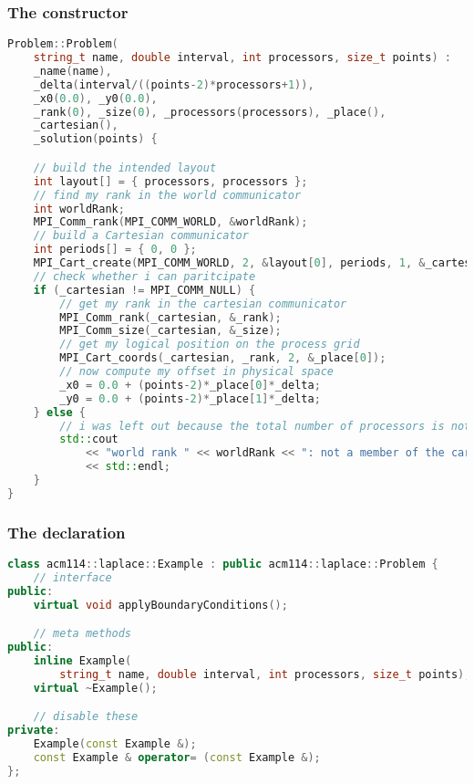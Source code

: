 \begin{frame}[fragile]
%
  \frametitle{The  constructor}
%
  \begin{lstlisting}[language=c++,name=mpi:driver,basicstyle=\tt\bfseries\tiny]
Problem::Problem(
    string_t name, double interval, int processors, size_t points) :
    _name(name),
    _delta(interval/((points-2)*processors+1)),
    _x0(0.0), _y0(0.0),
    _rank(0), _size(0), _processors(processors), _place(),
    _cartesian(),
    _solution(points) {

    // build the intended layout
    int layout[] = { processors, processors };
    // find my rank in the world communicator
    int worldRank;
    MPI_Comm_rank(MPI_COMM_WORLD, &worldRank);
    // build a Cartesian communicator
    int periods[] = { 0, 0 };
    MPI_Cart_create(MPI_COMM_WORLD, 2, &layout[0], periods, 1, &_cartesian);
    // check whether i can paritcipate
    if (_cartesian != MPI_COMM_NULL) {
        // get my rank in the cartesian communicator
        MPI_Comm_rank(_cartesian, &_rank);
        MPI_Comm_size(_cartesian, &_size);
        // get my logical position on the process grid
        MPI_Cart_coords(_cartesian, _rank, 2, &_place[0]);
        // now compute my offset in physical space
        _x0 = 0.0 + (points-2)*_place[0]*_delta;
        _y0 = 0.0 + (points-2)*_place[1]*_delta;
    } else {
        // i was left out because the total number of processors is not a square
        std::cout
            << "world rank " << worldRank << ": not a member of the cartesian communicator "
            << std::endl;
    }
}
  \end{lstlisting}
% 
\end{frame}


\begin{frame}[fragile]
%
  \frametitle{The  declaration}
%
  \begin{lstlisting}[language=c++,name=mpi:example-decl]
class acm114::laplace::Example : public acm114::laplace::Problem {
    // interface
public:
    virtual void applyBoundaryConditions();

    // meta methods
public:
    inline Example(
        string_t name, double interval, int processors, size_t points);
    virtual ~Example();

    // disable these
private:
    Example(const Example &);
    const Example & operator= (const Example &);
};
  \end{lstlisting}
% 
\end{frame}

